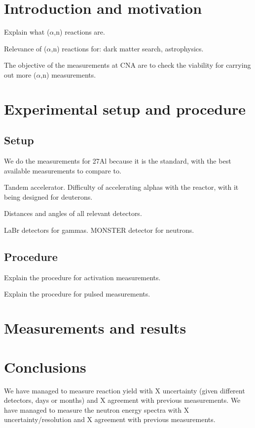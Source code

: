 \documentclass[a4paper,12pt]{report}
\author{Erik Cárdenas Mayoral}
\title{\HUGE{Title}}
\date{date}
\newcommand{\an}{($\alpha$,n) }
\begin{document}
\maketitle

\begin{abstract}
Abstract
\end{abstract}

\tableofcontents

\chapter{Introduction and motivation}
Explain what \an reactions are.

Relevance of \an reactions for: dark matter search, astrophysics.

The objective of the measurements at CNA are to check the viability for carrying out more \an measurements.


\chapter{Experimental setup and procedure}
\section{Setup}
We do the measurements for 27Al because it is the standard, with the best available measurements to compare to.

Tandem accelerator.
Difficulty of accelerating alphas with the reactor, with it being designed for deuterons.

Distances and angles of all relevant detectors.

LaBr detectors for gammas.
MONSTER detector for neutrons.

\section{Procedure}
Explain the procedure for activation measurements.

Explain the procedure for pulsed measurements.


\chapter{Measurements and results}


\chapter{Conclusions}
We have managed to measure reaction yield with X uncertainty (given different detectors, days or months) and X agreement with previous measurements.
We have managed to measure the neutron energy spectra with X uncertainty/resolution and X agreement with previous measurements.
\end{document}
